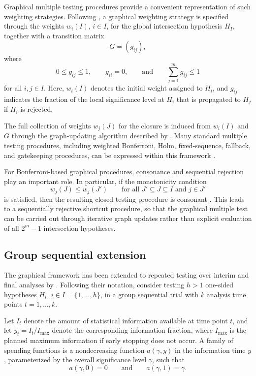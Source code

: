 \documentclass[article]{jss}
\begin{document}
Graphical multiple testing procedures provide a convenient representation of
such weighting strategies. Following \citet{Bretz2011}, a graphical weighting
strategy is specified through the weights $w_i(I)$, $i \in I$, for the global
intersection hypothesis $H_I$, together with a transition matrix
\[
G = (g_{ij}),
\]
where
\[
0 \leq g_{ij} \leq 1, \qquad g_{ii} = 0,
\qquad \text{and} \qquad \sum_{j=1}^m g_{ij} \leq 1
\]
for all $i,j \in I$. Here, $w_i(I)$ denotes the initial weight assigned to
$H_i$, and $g_{ij}$ indicates the fraction of the local significance level at
$H_i$ that is propagated to $H_j$ if $H_i$ is rejected.

The full collection of weights $w_j(J)$ for the closure is induced from
$w_i(I)$ and $G$ through the graph-updating algorithm described by
\citet{Bretz2011}. Many standard multiple testing procedures, including
weighted Bonferroni, Holm, fixed-sequence, fallback, and gatekeeping
procedures, can be expressed within this framework
\citep{Bretz2009,Bretz2011}.

For Bonferroni-based graphical procedures, consonance and sequential rejection
play an important role. In particular, if the monotonicity condition
\[
w_j(J) \leq w_j(J')
\qquad \text{for all } J' \subseteq J \subseteq I
\text{ and } j \in J'
\]
is satisfied, then the resulting closed testing procedure is consonant
\citep{Hommel2007,Bretz2011}. This leads to a sequentially rejective shortcut
procedure, so that the graphical multiple test can be carried out through
iterative graph updates rather than explicit evaluation of all
$2^m - 1$ intersection hypotheses.

\subsection{Group sequential extension}

The graphical framework has been extended to repeated testing over interim and
final analyses by \citet{MaurerBretz2013}. Following their notation, consider
testing $h > 1$ one-sided hypotheses $H_i$, $i \in I = \{1,\ldots,h\}$, in a
group sequential trial with $k$ analysis time points $t = 1,\ldots,k$.

Let $I_t$ denote the amount of statistical information available at time point
$t$, and let $y_t = I_t / I_{\max}$ denote the corresponding information
fraction, where $I_{\max}$ is the planned maximum information if early stopping
does not occur. A family of spending functions is a nondecreasing function
$a(\gamma,y)$ in the information time $y$, parameterized by the overall
significance level $\gamma$, such that
\[
a(\gamma,0)=0
\qquad \text{and} \qquad
a(\gamma,1)=\gamma.
\]
\end{document}
